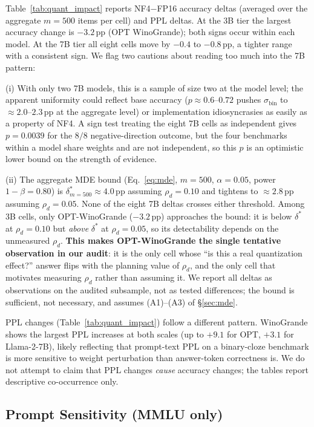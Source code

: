 \documentclass{article}
\begin{document}
Table~\ref{tab:quant_impact} reports NF4$-$FP16 accuracy deltas (averaged over the aggregate $m{=}500$ items per cell) and PPL deltas. At the 3B tier the largest accuracy change is $-3.2$\,pp (OPT WinoGrande); both signs occur within each model. At the 7B tier all eight cells move by $-0.4$ to $-0.8$\,pp, a tighter range with a consistent sign. We flag two cautions about reading too much into the 7B pattern:

(i) With only two 7B models, this is a sample of size two at the model level; the apparent uniformity could reflect base accuracy ($p\approx0.6$--$0.72$ pushes $\sigma_{\text{bin}}$ to $\approx 2.0$--$2.3$\,pp at the aggregate level) or implementation idiosyncrasies as easily as a property of NF4. A sign test treating the eight 7B cells as independent gives $p{=}0.0039$ for the $8/8$ negative-direction outcome, but the four benchmarks within a model share weights and are not independent, so this $p$ is an optimistic lower bound on the strength of evidence.

(ii) The aggregate MDE bound (Eq.~\ref{eq:mde}, $m{=}500$, $\alpha{=}0.05$, power $1-\beta{=}0.80$) is $\delta^*_{m=500}\approx 4.0$\,pp assuming $\rho_d{=}0.10$ and tightens to $\approx 2.8$\,pp assuming $\rho_d{=}0.05$. None of the eight 7B deltas crosses either threshold. Among 3B cells, only OPT-WinoGrande ($-3.2$\,pp) approaches the bound: it is below $\delta^*$ at $\rho_d{=}0.10$ but \emph{above} $\delta^*$ at $\rho_d{=}0.05$, so its detectability depends on the unmeasured $\rho_d$. \textbf{This makes OPT-WinoGrande the single tentative observation in our audit}: it is the only cell whose ``is this a real quantization effect?'' answer flips with the planning value of $\rho_d$, and the only cell that motivates measuring $\rho_d$ rather than assuming it. We report all deltas as observations on the audited subsample, not as tested differences; the bound is sufficient, not necessary, and assumes (A1)--(A3) of §\ref{sec:mde}.

PPL changes (Table~\ref{tab:quant_impact}) follow a different pattern. WinoGrande shows the largest PPL increases at both scales (up to $+9.1$ for OPT, $+3.1$ for Llama-2-7B), likely reflecting that prompt-text PPL on a binary-cloze benchmark is more sensitive to weight perturbation than answer-token correctness is. We do not attempt to claim that PPL changes \emph{cause} accuracy changes; the tables report descriptive co-occurrence only.

\subsection{Prompt Sensitivity (MMLU only)}
\end{document}
